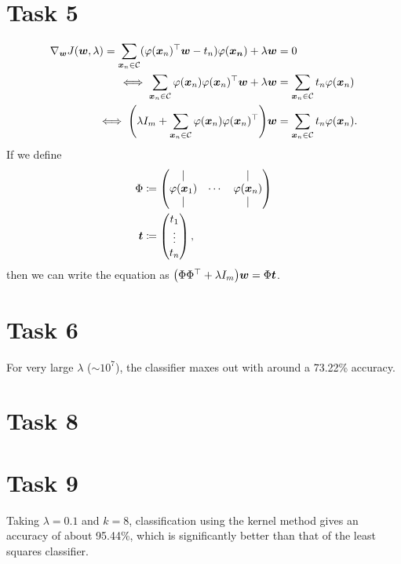 \documentclass{article}
\newcommand{\T}{\top}
\newcommand{\C}{\mathcal{C}}
\renewcommand{\matrix}[1]{\begin{pmatrix} #1 \end{pmatrix}}
\renewcommand{\vec}[1]{\boldsymbol{#1}}
\renewcommand{\phi}{\varphi}
\DeclarePairedDelimiter{\p}{(}{)}
\begin{document}
\section*{Task 5}
\begin{align*}
	\nabla_{\vec{w}} J\p{\vec{w}, \lambda} = \sum_{\vec{x}_n\in\C} \p{\phi\p{\vec{x}_n}^\T\vec{w} - t_n}\phi\p{\vec{x_n}} + \lambda\vec{w} &= 0 \\
	\iff \sum_{\vec{x}_n\in\C} \phi\p{\vec{x}_n}\phi\p{\vec{x}_n}^\T\vec{w} + \lambda\vec{w} &= \sum_{\vec{x}_n\in\C} t_n\phi\p{\vec{x}_n} \\
	\iff \p*{\lambda I_m + \sum_{\vec{x}_n\in\C} \phi\p{\vec{x}_n}\phi\p{\vec{x}_n}^\T}\vec{w} &= \sum_{\vec{x}_n\in\C} t_n\phi\p{\vec{x}_n}.
\end{align*}
If we define
\begin{align*}
	\Phi &\coloneqq \matrix{
		\vert & & \vert \\
		\phi\p{\vec{x}_1} & \cdots & \phi\p{\vec{x}_n} \\
		\vert & & \vert
	} \\
	\vec{t} &\coloneqq \matrix{t_1\\\vdots\\t_n},
\end{align*}
then we can write the equation as $\p*{\Phi\Phi^\T + \lambda I_m}\vec{w} = \Phi\vec{t}$.


\section*{Task 6}
For very large $\lambda$ ($\sim 10^7$), the classifier maxes out with around a 73.22\% accuracy.

\pagebreak
\section*{Task 8}


\pagebreak
\section*{Task 9}
Taking $\lambda = 0.1$ and $k = 8$, classification using the kernel method gives an accuracy of about 95.44\%, which is significantly better than that of the least squares classifier.
\end{document}
